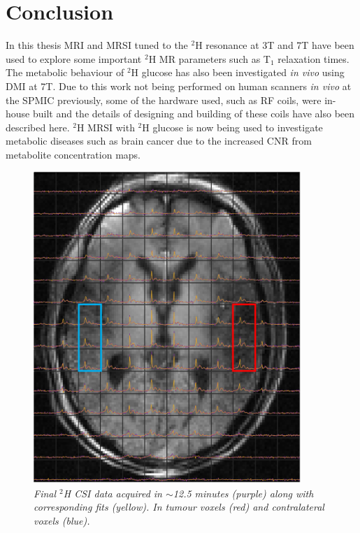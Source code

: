 \chapter{Conclusion}
\label{section:Conclusion}

In this thesis \ac{MRI} and \ac{MRSI} tuned to the $^2$H resonance at 3T and 7T have been used to explore some important $^2$H MR parameters such as T$_1$ relaxation times. The metabolic behaviour of $^2$H glucose has also been investigated \textit{in vivo} using \ac{DMI} at 7T. Due to this work not being performed on human scanners \textit{in vivo} at the \ac{SPMIC} previously, some of the hardware used, such as \ac{RF} coils, were in-house built and the details of designing and building of these coils have also been described here. $^2$H MRSI with $^2$H glucose is now being used to investigate metabolic diseases such as brain cancer due to the increased \ac{CNR} from metabolite concentration maps. 

\begin{figure}
    \centering
    \includegraphics[width = 0.9\textwidth]{Figures/Conclusion/CSI.png}
    \caption{\textit{Final $^2$H CSI data acquired in $\sim$12.5 minutes (purple) along with corresponding fits (yellow). In tumour voxels (red) and contralateral voxels (blue).}}
    \label{fig:Conc:CSI}
\end{figure}

